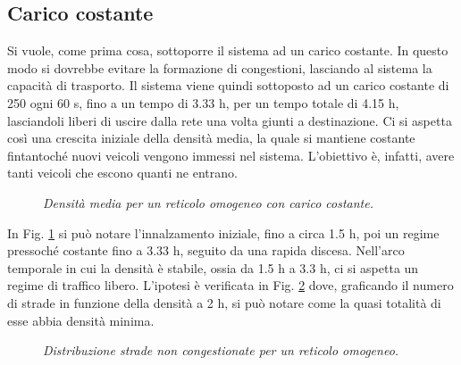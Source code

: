 \documentclass[../main.tex]{subfiles}
\begin{document}
\subsection{Carico costante}
Si vuole, come prima cosa, sottoporre il sistema ad un carico costante.
In questo modo si dovrebbe evitare la formazione di congestioni, lasciando al sistema la capacit\`a di trasporto.
Il sistema viene quindi sottoposto ad un carico costante di 250 ogni 60 s, fino a un tempo di  3.33 h, per un tempo totale di 4.15 h, lasciandoli liberi di uscire dalla rete una volta giunti a destinazione.
Ci si aspetta cos\`i una crescita iniziale della densit\`a media, la quale si mantiene costante fintantoch\'e nuovi veicoli vengono immessi nel sistema.
L'obiettivo \`e, infatti, avere tanti veicoli che escono quanti ne entrano.
\begin{figure}[H]
    \centering
    \caption[Densit\`a media per un reticolo omogeneo con carico costante]{\emph{Densit\`a media per un reticolo omogeneo con carico costante.}}
    \label{fig:density_constant_homo}
\end{figure}
In Fig. \ref{fig:density_constant_homo} si pu\`o notare l'innalzamento iniziale, fino a circa 1.5 h, poi un regime pressoch\'e costante fino a 3.33 h, seguito da una rapida discesa.
Nell'arco temporale in cui la densit\`a \`e stabile, ossia da 1.5 h a 3.3 h, ci si aspetta un regime di traffico libero.
L'ipotesi \`e verificata in Fig. \ref{fig:nStreet_density_constant_homo} dove, graficando il numero di strade in funzione della densit\`a a 2 h, si pu\`o notare come la quasi totalit\`a di esse abbia densit\`a minima.
\begin{figure}[H]
    \centering
    \caption[Distribuzione strade non congestionate per un reticolo omogeneo.]{\emph{Distribuzione strade non congestionate per un reticolo omogeneo.}}
    \label{fig:nStreet_density_constant_homo}
\end{figure}
\end{document}
